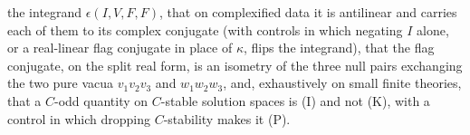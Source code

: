 the integrand $\epsilon(I, V, F, F)$, that on complexified data it is antilinear and carries each of them to its complex conjugate (with controls in which negating $I$ alone, or a real-linear flag conjugate in place of $\kappa$, flips the integrand), that the flag conjugate, on the split real form, is an isometry of the three null pairs exchanging the two pure vacua $v_{1}v_{2}v_{3}$ and $w_{1}w_{2}w_{3}$, and, exhaustively on small finite theories, that a $C$-odd quantity on $C$-stable solution spaces is (I) and not (K), with a control in which dropping $C$-stability makes it (P).
